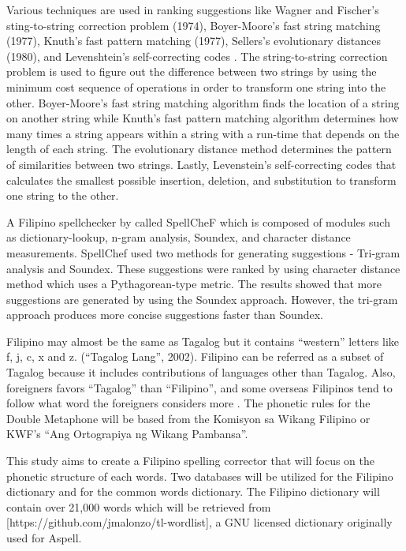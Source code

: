 \documentclass[12pt]{book}
\begin{document}
Various techniques are used in ranking suggestions like Wagner and Fischer’s sting-to-string correction problem (1974), Boyer-Moore’s fast string matching (1977), Knuth’s fast pattern matching (1977), Sellers’s evolutionary distances (1980), and Levenshtein’s self-correcting codes \cite{blank2012spelling}. The string-to-string correction problem is used to figure out the difference between two strings by using the minimum cost sequence of operations in order to transform one string into the other\cite{wagner1974string}. Boyer-Moore’s fast string matching algorithm finds the location of a string on another string\cite{boyer1977fast} while Knuth’s fast pattern matching algorithm determines how many times a string appears within a string with a run-time that depends on the length of each string\cite{knuth1977fast}. The evolutionary distance method determines the pattern of similarities between two strings\cite{sellers1980theory}. Lastly, Levenstein’s self-correcting codes that calculates the smallest possible insertion, deletion, and substitution to transform one string to the other\cite{levenshtein1966binary}.

A Filipino spellchecker by \cite{cheng2007spellchef} called SpellCheF which is composed of modules such as dictionary-lookup, n-gram analysis, Soundex, and character distance measurements. SpellChef used two methods for generating suggestions - Tri-gram analysis and Soundex. These suggestions were ranked by using character distance method which uses a Pythagorean-type metric. The results showed that more suggestions are generated by using the Soundex approach. However, the tri-gram approach produces more concise suggestions faster than Soundex.

Filipino may almost be the same as Tagalog but it contains “western” letters like f, j, c, x and z.  (“Tagalog Lang”, 2002). Filipino can be referred as a subset of Tagalog because it includes contributions of languages other than Tagalog. Also, foreigners favors “Tagalog” than “Filipino”, and some overseas Filipinos tend to follow what word the foreigners considers more \cite{Filipino}. The phonetic rules for the Double Metaphone will be based from the Komisyon sa Wikang Filipino or KWF’s “Ang Ortograpiya ng Wikang Pambansa”.

This study aims to create a Filipino spelling corrector that will focus on the phonetic structure of each words. Two databases will be utilized for the Filipino dictionary and for the common words dictionary. The Filipino dictionary will contain over 21,000 words which will be retrieved from [https://github.com/jmalonzo/tl-wordlist], a GNU licensed dictionary originally used for Aspell.
\end{document}
